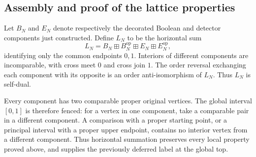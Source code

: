 \subsection{Assembly and proof of the lattice properties}

Let $B_N$ and $E_N$ denote respectively the decorated Boolean and
detector components just constructed.  Define $L_N$ to be the
horizontal sum
\begin{equation}
\label{lat:horizontal-sum}
       L_N=B_N\boxplus B_N^{\mathrm{op}}
                  \boxplus E_N\boxplus E_N^{\mathrm{op}},
\end{equation}
identifying only the common endpoints $0,1$.  Interiors of different
components are incomparable, with cross meet $0$ and cross join $1$.
The order reversal exchanging each component with its opposite is
an order anti-isomorphism of $L_N$.  Thus $L_N$ is self-dual.

Every component has two comparable proper original vertices.  The
global interval $[0,1]$ is therefore fenced: for a vertex in one
component, take a comparable pair in a different component.  A
comparison with a proper starting point, or a principal interval with
a proper upper endpoint, contains no interior vertex from a different
component.  Thus horizontal summation preserves every local property
proved above, and supplies the previously deferred label at the
global top.

